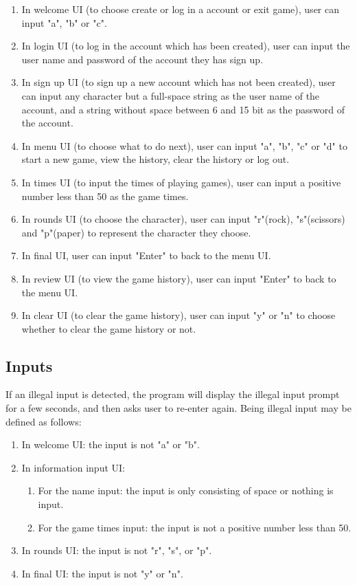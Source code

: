 \documentclass[12pt]{article}
\begin{document}
	\begin{enumerate}
	\item In welcome UI (to choose create or log in a account or exit game), user can input "a", "b" or "c".
	\item In login UI (to log in the account which has been created), user can input the user name and password of the account they has sign up.
	\item In sign up UI (to sign up a new account which has not been created), user can input any character but a full-space string as the user name of the account, and a string without space between 6 and 15 bit as the password of the account.
	\item In menu UI (to choose what to do next), user can input "a", "b", "c" or "d" to start a new game, view the history, clear the history or log out.	
	\item In times UI (to input the times of playing games), user can input a positive number less than 50 as the game times.
	\item In rounds UI (to choose the character), user can input "r"(rock), "s"(scissors) and "p"(paper) to represent the character they choose.
	\item In final UI, user can input "Enter" to back to the menu UI.
	\item In review UI (to view the game history), user can input "Enter" to back to the menu UI.
	\item In clear UI (to clear the game history), user can input "y" or "n" to choose whether to clear the game history or not.
	\end{enumerate}

	\subsection{Inputs}
	If an illegal input is detected, the program will display the illegal input prompt for a few seconds, and then asks user to re-enter again. Being illegal input may be defined as follows:
	
	\begin{enumerate}
	\item In welcome UI: the input is not "a" or "b".
	\item In information input UI:
	
		\begin{enumerate}[1)]
		\item For the name input: the input is only consisting of space or nothing is input.
		\item For the game times input: the input is not a positive number less than 50.
		\end{enumerate}
	
	\item In rounds UI: the input is not "r", "s", or "p".
	\item In final UI: the input is not "y" or "n".
	\end{enumerate}
\end{document}
